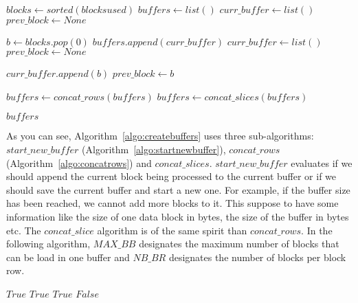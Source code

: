 \documentclass[conference]{IEEEtran}
\begin{document}
\begin{algorithm}
  \caption{$create\_buffers(blocks\_used)$}
  \label{algo:createbuffers}
  \begin{algorithmic}
    \STATE $blocks \leftarrow sorted(blocks used)$
    \STATE $buffers \leftarrow list()$
    \STATE $curr\_buffer \leftarrow list()$
    \STATE $prev\_block \leftarrow None$

        \STATE $b \leftarrow blocks.pop(0)$
          \STATE $buffers.append(curr\_buffer)$
          \STATE $curr\_buffer \leftarrow list()$
          \STATE $prev\_block \leftarrow None$
        \ENDIF

        \STATE $curr\_buffer.append(b)$
        \STATE $prev\_block \leftarrow b$
    \ENDWHILE

      \STATE $buffers \leftarrow concat\_rows(buffers)$
        \STATE $buffers \leftarrow concat\_slices(buffers)$
      \ENDIF
    \ENDIF

    \RETURN $buffers$
  \end{algorithmic}
\end{algorithm}

As you can see, Algorithm~\ref{algo:createbuffers} uses three sub-algorithms: $start\_new\_buffer$ (Algorithm~\ref{algo:startnewbuffer}), $concat\_rows$ (Algorithm~\ref{algo:concatrows}) and $concat\_slices$. $start\_new\_buffer$ evaluates if we should append the current block being processed to the current buffer or if we should save the current buffer and start a new one. For example, if the buffer size has been reached, we cannot add more blocks to it. This suppose to have some information like the size of one data block in bytes, the size of the buffer in bytes etc. The $concat\_slice$ algorithm is of the same spirit than $concat\_rows$. In the following algorithm, $MAX\_BB$ designates the maximum number of blocks that can be load in one buffer and $NB\_BR$ designates the number of blocks per block row.

\begin{algorithm}
  \caption{$start\_new\_buffer(b, prev\_block, MAX\_BB, NB\_BR)$}
  \label{algo:startnewbuffer}
  \begin{algorithmic}
      \RETURN $True$
    \ENDIF
      \RETURN $True$
    \ENDIF
      \RETURN $True$
    \ENDIF
    \RETURN $False$
  \end{algorithmic}
\end{algorithm}
\end{document}
